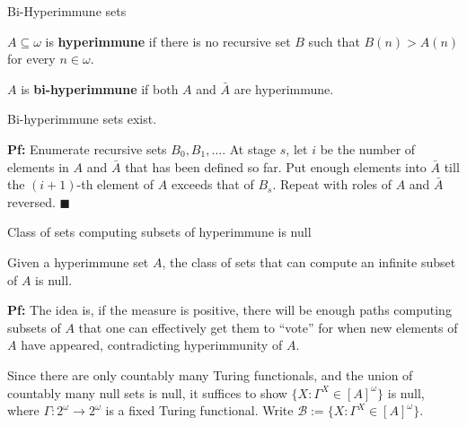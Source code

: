 \begin{frame}{Bi-Hyperimmune sets}
  \begin{define}[Hyperimmune]
    $A\subseteq\omega$ is \textbf{hyperimmune} if there is no recursive set
    $B$ such that $B(n)>A(n)$ for every $n\in\omega$.
  \end{define}

  \begin{define}[Bi-hyperimmune]
    $A$ is \textbf{bi-hyperimmune} if both $A$ and $\bar{A}$ are hyperimmune.
  \end{define}

  \begin{thm}
    Bi-hyperimmune sets exist.
  \end{thm}

  \vspace{0.5em}
  \textbf{Pf:} Enumerate recursive sets $B_0,B_1,\ldots$. At stage $s$, let
  $i$ be the number of elements in $A$ and $\bar{A}$ that has been defined
  so far. Put enough elements into $\bar{A}$ till the $(i+1)$-th element of
  $A$ exceeds that of $B_s$. Repeat with roles of $A$ and $\bar{A}$
  reversed. $\blacksquare$
\end{frame}

\begin{frame}{Class of sets computing subsets of hyperimmune is null}
  \begin{thm}
    \label{thm:bihyper-null}
    Given a hyperimmune set $A$, the class of sets that can compute an
    infinite subset of $A$ is null.
  \end{thm}

  \vspace{1em}
  \textbf{Pf:} The idea is, if the measure is positive, there will be
  enough paths computing subsets of $A$ that one can effectively get them
  to ``vote'' for when new elements of $A$ have appeared, contradicting
  hyperimmunity of $A$.

  \vspace{1em}
  Since there are only countably many Turing functionals, and the union of
  countably many null sets is null, it suffices to show $\{X:
  \Gamma^X\in[A]^\omega\}$ is null, where
  $\Gamma:2^\omega\rightarrow2^\omega$ is a fixed Turing functional.
  Write $\mathcal{B} :=\{X: \Gamma^X\in[A]^\omega\}$.
\end{frame}

